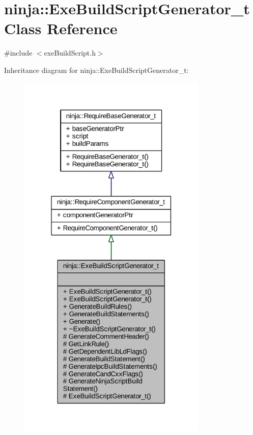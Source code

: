 \hypertarget{classninja_1_1_exe_build_script_generator__t}{}\section{ninja\+:\+:Exe\+Build\+Script\+Generator\+\_\+t Class Reference}
\label{classninja_1_1_exe_build_script_generator__t}


{\ttfamily \#include $<$exe\+Build\+Script.\+h$>$}



Inheritance diagram for ninja\+:\+:Exe\+Build\+Script\+Generator\+\_\+t\+:
\nopagebreak
\begin{figure}[H]
\begin{center}
\leavevmode
\includegraphics[width=256pt]{classninja_1_1_exe_build_script_generator__t__inherit__graph}
\end{center}
\end{figure}



